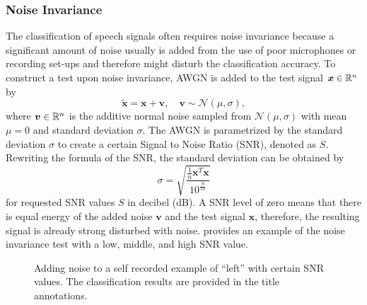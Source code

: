\subsubsection{Noise Invariance}
The classification of speech signals often requires noise invariance because a significant amount of noise usually is added from the use of poor microphones or recording set-ups and therefore might disturb the classification accuracy.
To construct a test upon noise invariance, AWGN is added to the test signal $\bm{x} \in \mathbb{R}^n$ by
\begin{equation}
  \bm{\tilde{x}} = \bm{x} + \bm{v}, \quad \bm{v} \sim \mathcal{N}(\mu, \sigma),
\end{equation}
where $\bm{v} \in \mathbb{R}^n$ is the additive normal noise sampled from $\mathcal{N}(\mu, \sigma)$ with mean $\mu = 0$ and standard deviation $\sigma$.
The AWGN is parametrized by the standard deviation $\sigma$ to create a certain Signal to Noise Ratio (SNR), denoted as $S$.
Rewriting the formula of the SNR, the standard deviation can be obtained by
\begin{equation}
  \sigma = \sqrt{\frac{\frac{1}{n}\bm{x}^T \bm{x}}{10^{\frac{S}{10}}}}
\end{equation}
for requested SNR values $S$ in decibel (dB).
A SNR level of zero means that there is equal energy of the added noise $\bm{v}$ and the test signal $\bm{x}$, therefore, the resulting signal is already strong disturbed with noise.
 provides an example of the noise invariance test with a low, middle, and high SNR value.
\begin{figure}[!ht]
  \centering
    \quad
  \caption{Adding noise to a self recorded example of \enquote{left} with certain SNR values. The classification results are provided in the title annotations.}
  \label{fig:exp_details_tb_noise_left}
\end{figure}
